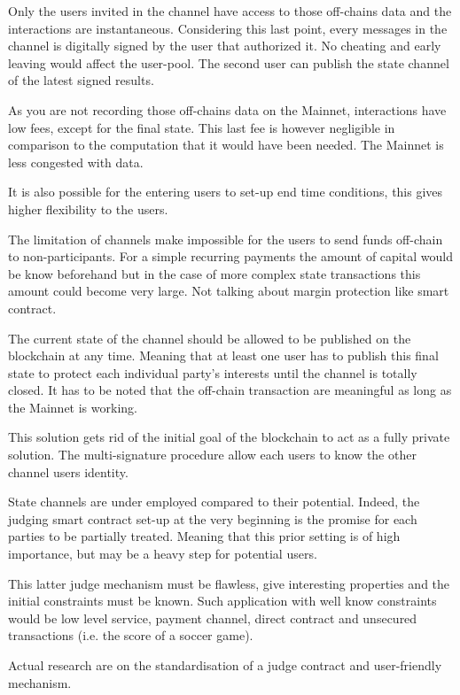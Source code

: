 Only the users invited in the channel have access to those off-chains data and the interactions are instantaneous. Considering this last point, every messages in the channel is digitally signed by the user that authorized it. No cheating and early leaving would affect the user-pool. The second user can publish the state channel of the latest signed results.

As you are not recording those off-chains data on the Mainnet, interactions have low fees, except for the final state. This last fee is however negligible in comparison to the computation that it would have been needed. The Mainnet is less congested with data.

It is also possible for the entering users to set-up end time conditions, this gives higher flexibility to the users.

The limitation of channels make impossible for the users to send funds off-chain to non-participants. For a simple recurring payments the amount of capital would be know beforehand but in the case of more complex state transactions this amount could become very large. Not talking about margin protection like smart contract.

The current state of the channel should be allowed to be published on the blockchain at any time. Meaning that at least one user has to publish this final state to protect each individual party's interests until the channel is totally closed. It has to be noted that the off-chain transaction are meaningful as long as the Mainnet is working.

This solution gets rid of the initial goal of the blockchain to act as a fully private solution. The multi-signature procedure allow each users to know the other channel users identity.

State channels are under employed compared to their potential. Indeed, the judging smart contract set-up at the very beginning is the promise for each parties to be partially treated. Meaning that this prior setting is of high importance, but may be a heavy step for potential users.

This latter judge mechanism must be flawless, give interesting properties and the initial constraints must be known. Such application with well know constraints would be low level service, payment channel, direct contract and unsecured transactions (i.e. the score of a soccer game). 

Actual research are on the standardisation of a judge contract and user-friendly mechanism.


